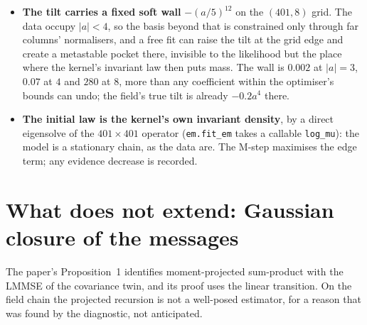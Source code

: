 \documentclass[10pt,a4paper]{article}
\newcommand{\code}[1]{\texttt{\small #1}}
\newcommand{\st}[1]{\textbf{#1}}
\theoremstyle{plain}
\theoremstyle{remark}
\begin{document}
\begin{itemize}[leftmargin=1.4em,itemsep=0.1em]
\item \st{The tilt carries a fixed soft wall} $-(a/5)^{12}$ on the $(401,8)$ grid. The data occupy
  $|a|<4$, so the basis beyond that is constrained only through far columns' normalisers, and a free
  fit can raise the tilt at the grid edge and create a metastable pocket there, invisible to the
  likelihood but the place where the kernel's invariant law then puts mass. The wall is $0.002$ at
  $|a|=3$, $0.07$ at $4$ and $280$ at $8$, more than any coefficient within the optimiser's bounds can
  undo; the field's true tilt is already $-0.2a^4$ there.
\item \st{The initial law is the kernel's own invariant density}, by a direct eigensolve of the
  $401\times401$ operator (\code{em.fit\_em} takes a callable \code{log\_mu}): the model is a stationary
  chain, as the data are. The M-step maximises the edge term; any evidence decrease is recorded.
\end{itemize}

\section{What does not extend: Gaussian closure of the messages}\label{sec:closure}

The paper's Proposition~1 identifies moment-projected sum-product with the LMMSE of the covariance
twin, and its proof uses the linear transition. On the field chain the projected recursion is not a
well-posed estimator, for a reason that was found by the diagnostic, not anticipated.
\end{document}
